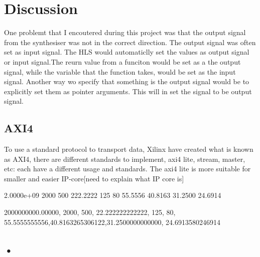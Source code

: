 \chapter{Discussion} \label{discussion}

One problemt that I encoutered during this project was that the output signal from the synthesiser was not in the correct direction. The output signal was often set as input signal. The HLS would automaticlly set the values as output signal or input signal.The reurn value from a funciton would be set as a the output signal, while the variable that the function takes, would be set as the input signal. Another way wo specify that something is the output signal would be to explicitly set them as pointer arguments. This will in set the signal to be output signal.

\section{AXI4}
To use a standard protocol to transport data, Xilinx have created what is known as AXI4, there are different standards to implement, axi4 lite, stream, master, etc: each have a different usage and standards. The axi4 lite is more suitable for smaller and easier IP-core[need to explain what IP core is]


2.0000e+09	2000	500	222.2222	125	80	55.5556	40.8163	31.2500	24.6914

2000000000.00000, 2000, 500, 22.222222222222, 125, 80, 55.5555555556,40.8163265306122,31.2500000000000, 24.6913580246914

\section{•}